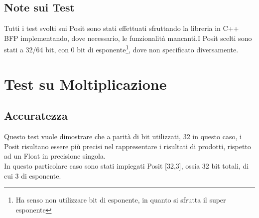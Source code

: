\documentclass[a4paper,11pt]{article}
\begin{document}
	\subsection{Note sui Test}
	Tutti i test svolti sui Posit sono stati effettuati sfruttando la libreria in C++ BFP\cite{libbfp} 
	implementando, dove necessario, le funzionalità mancanti.\newline I Posit scelti sono stati a 32/64 bit, con 0 bit di esponente\footnote{Ha senso non utilizzare bit di esponente, in quanto si sfrutta il super esponente}, dove non specificato diversamente.
	
\newpage
\section {Test su Moltiplicazione}
\subsection{Accuratezza}

Questo test vuole dimostrare che a parità di bit utilizzati, 32 in questo caso, i Posit risultano essere più precisi nel rappresentare i risultati di prodotti, rispetto ad un Float in precisione singola.\\
In questo particolare caso sono stati impiegati Posit [32,3], ossia 32 bit totali, di cui 3 di esponente.
\end{document}
